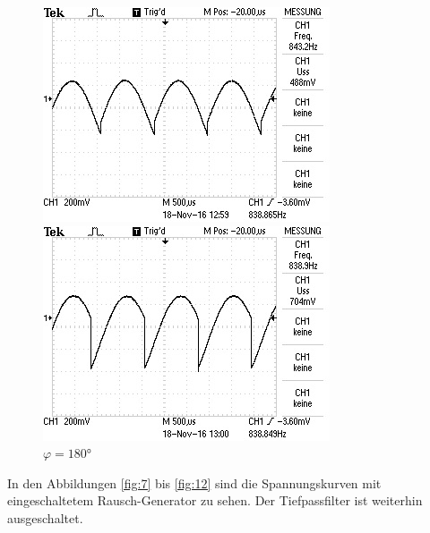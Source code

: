 \begin{figure}[!h]
\begin{minipage}[t]{0.3\textwidth}
\includegraphics[width=\textwidth]{Bilder/Rausch270.jpg}
\caption{$\varphi = 180\si{\degree}$}
\label{fig:11}
\end{minipage}
\hspace{12pt}
\vspace{5pt}
\begin{minipage}[t]{0.3\textwidth}
\includegraphics[width=\textwidth]{Bilder/Rausch315.jpg}
\caption{$\varphi = 180\si{\degree}$}
\label{fig:12}
\end{minipage}
\hspace{12pt}
\vspace{5pt}
\end{figure}

In den Abbildungen \eqref{fig:7} bis \eqref{fig:12} sind die Spannungskurven mit
eingeschaltetem Rausch-Generator zu sehen. Der Tiefpassfilter ist weiterhin ausgeschaltet. \\

